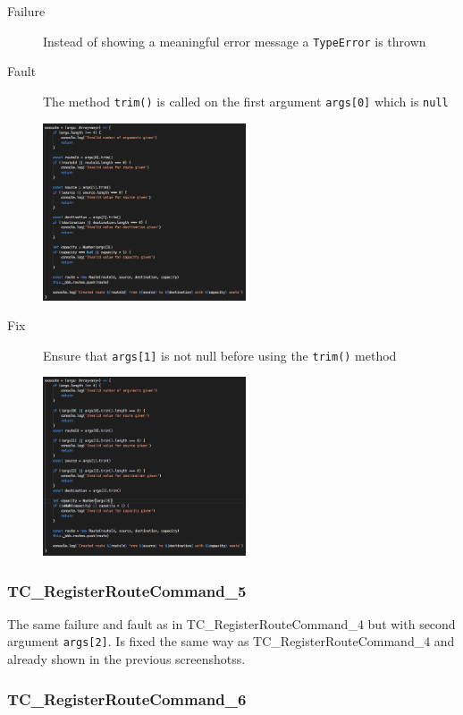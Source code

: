 \documentclass[11pt]{article}
\begin{document}
\begin{description}
\item[{Failure}] Instead of showing a meaningful error message a \texttt{TypeError} is thrown
\item[{Fault}] The method \texttt{trim()} is called on the first argument \texttt{args[0]} which is \texttt{null}
\begin{center}
\includegraphics[width=6cm]{./Iteration3.rtfd/Pasted Graphic 7.tiff.png}
\end{center}
\item[{Fix}] Ensure that \texttt{args[1]} is not null before using the \texttt{trim()} method
\begin{center}
\includegraphics[width=6cm]{./Iteration3.rtfd/Pasted Graphic 14.tiff.png}
\end{center}
\end{description}

\subsubsection{TC\_RegisterRouteCommand\_5}
\label{sec:org0f3a20c}

The same failure and fault as in TC\_RegisterRouteCommand\_4 but with second argument \texttt{args[2]}. Is fixed the same way as TC\_RegisterRouteCommand\_4 and already shown in the previous screenshotss.

\subsubsection{TC\_RegisterRouteCommand\_6}
\label{sec:orgcaf676c}
\end{document}
